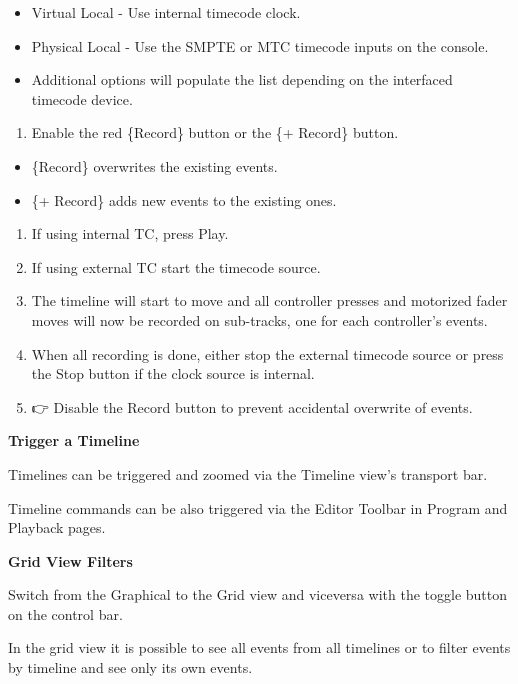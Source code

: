 \documentclass[
]{article}
\providecommand{\tightlist}{%
  \setlength{\itemsep}{0pt}\setlength{\parskip}{0pt}}
\begin{document}
\begin{itemize}
\item
  Virtual Local - Use internal timecode clock.
\item
  Physical Local - Use the SMPTE or MTC timecode inputs on the console.
\item
  Additional options will populate the list depending on the interfaced timecode device.
\end{itemize}

\begin{enumerate}
\def\labelenumi{\arabic{enumi}.}
\setcounter{enumi}{5}
\tightlist
\item
  Enable the red \{Record\} button or the \{+ Record\} button.
\end{enumerate}

\begin{itemize}
\item
  \{Record\} overwrites the existing events.
\item
  \{+ Record\} adds new events to the existing ones.
\end{itemize}

\begin{enumerate}
\def\labelenumi{\arabic{enumi}.}
\setcounter{enumi}{6}
\item
  If using internal TC, press Play.
\item
  If using external TC start the timecode source.
\item
  The timeline will start to move and all controller presses and motorized fader moves will now be recorded on sub-tracks, one for each controller's events.
\item
  When all recording is done, either stop the external timecode source or press the Stop button if the clock source is internal.
\item
  👉 {Disable the Record button to prevent accidental overwrite of events.}
\end{enumerate}

\textbf{Trigger a Timeline}

Timelines can be triggered and zoomed via the Timeline view's transport bar.

Timeline commands can be also triggered via the Editor Toolbar in Program and Playback pages.

\textbf{Grid View Filters}

Switch from the Graphical to the Grid view and viceversa with the toggle button on the control bar.

In the grid view it is possible to see all events from all timelines or to filter events by timeline and see only its own events.
\end{document}
